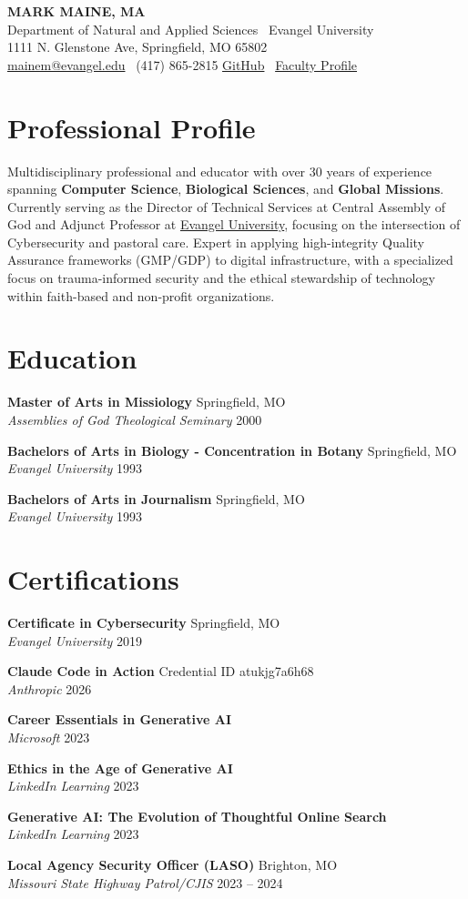\documentclass[11pt,letterpaper]{article}
\newcommand{\cvitem}[4]{
    \noindent\textbf{#1} \hfill #2 \\
    \textit{#3} \hfill #4 \par
    \vspace{6pt}
}
\begin{document}
\begin{center}
    {\LARGE \textbf{\color{EUMaroon} MARK MAINE, MA}} \\
    \vspace{6pt}
    \small
    Department of Natural and Applied Sciences \textbullet \ Evangel University \\
    1111 N. Glenstone Ave, Springfield, MO 65802 \\
    \href{mailto:mainem@evangel.edu}{mainem@evangel.edu} \textbullet \ (417) 865-2815 \textbullet \href{https://github.com/marcus7288}{GitHub} \textbullet \ \href{https://www.evangel.edu/faculty/mark-maine/}{Faculty Profile}
\end{center}

\section{Professional Profile}
Multidisciplinary professional and educator with over 30 years of experience spanning \textbf{Computer Science}, \textbf{Biological Sciences}, and \textbf{Global Missions}. Currently serving as the Director of Technical Services at Central Assembly of God and Adjunct Professor at \href{https://www.evangel.edu/faculty/mark-maine/}{Evangel University}, focusing on the intersection of Cybersecurity and pastoral care. Expert in applying high-integrity Quality Assurance frameworks (GMP/GDP) to digital infrastructure, with a specialized focus on trauma-informed security and the ethical stewardship of technology within faith-based and non-profit organizations.

\section{Education}
\cvitem{Master of Arts in Missiology}{Springfield, MO}{Assemblies of God Theological Seminary}{2000}
\cvitem{Bachelors of Arts in Biology - Concentration in Botany}{Springfield, MO}{Evangel University}{1993}
\cvitem{Bachelors of Arts in Journalism}{Springfield, MO}{Evangel University}{1993}

\section{Certifications}
\cvitem{Certificate in Cybersecurity}{Springfield, MO}{Evangel University}{2019}
\cvitem{Claude Code in Action}{Credential ID atukjg7a6h68}{Anthropic}{2026}
\cvitem{Career Essentials in Generative AI}{}{Microsoft}{2023}
\cvitem{Ethics in the Age of Generative AI}{}{LinkedIn Learning}{2023}
\cvitem{Generative AI: The Evolution of Thoughtful Online Search}{}{LinkedIn Learning}{2023}
\cvitem{Local Agency Security Officer (LASO)}{Brighton, MO}{Missouri State Highway Patrol/CJIS}{2023 -- 2024}
\end{document}
